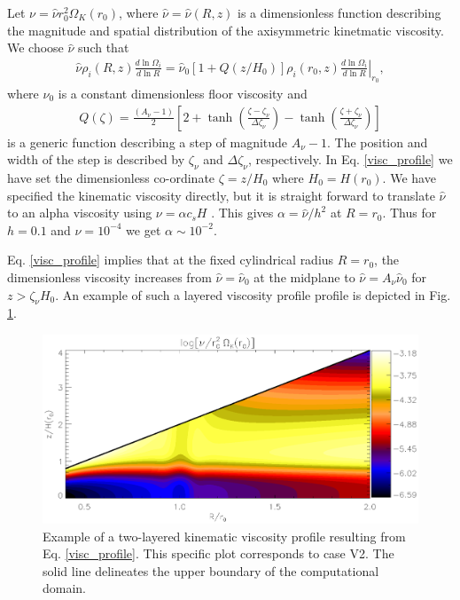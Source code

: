 Let $\nu = \hat{\nu}r_0^2\Omega_K(r_0)$, where
$\hat{\nu}=\hat{\nu}(R,z)$ is a dimensionless function describing
the magnitude and spatial distribution of the axisymmetric kinetmatic
viscosity. We choose $\hat{\nu}$ such that   
\begin{align}\label{visc_profile}
  \hat{\nu}\rho_i(R,z)\frac{d\ln{\Omega_i}}{d\ln{R}} =
  \hat{\nu}_0\left[1+Q(z/H_0)\right]\rho_i(r_0,z)\left.\frac{d\ln{\Omega_i}}{d\ln{R}}\right|_{r_0}, 
\end{align}
where $\nu_0$ is a constant dimensionless floor viscosity and   
\begin{align}\label{step}
  Q(\zeta) = \frac{\left(A_\nu - 1\right)}{2}
  \left[  2 + \tanh{\left(\frac{\zeta - \zeta_\nu}{\Delta\zeta_\nu}\right)}
    - \tanh{\left(\frac{\zeta +
        \zeta_\nu}{\Delta\zeta_\nu}\right)}\right]
\end{align}
is a generic function describing a step of magnitude
$A_\nu-1$. The position and width of the step is described by
$\zeta_\nu$ and $\Delta\zeta_\nu$, respectively. 
In Eq. \ref{visc_profile} we have set the dimensionless co-ordinate
$\zeta=z/H_0$ where $H_0=H(r_0)$. We have specified
the kinematic viscosity directly, but it is straight forward to
translate $\hat{\nu}$ to an alpha viscosity 
using $\nu = \alpha c_s H$ \citep{shakura73}. This gives $\alpha =
\hat{\nu}/h^2$ at $R=r_0$.  Thus for $h=0.1$ and $\hat{\nu}=10^{-4}$ we
get $\alpha\sim 10^{-2}$.  

Eq. \ref{visc_profile} implies that at the fixed cylindrical radius
$R=r_0$, the dimensionless viscosity increases from $\hat{\nu} =
\hat{\nu}_0$ at the midplane to $\hat{\nu} = A_\nu\hat{\nu}_0$ for
$z > \zeta_\nu H_0$. An example of such a layered viscosity profile
profile is depicted in Fig. \ref{visc2d}. 
 

\begin{figure}
  \centering
  \includegraphics[width=\linewidth]{figures/pdisk_visc2d_layer2}
  \caption{Example of a two-layered kinematic viscosity profile
    resulting from Eq. \ref{visc_profile}. This specific plot
    corresponds to case V2. The solid line
    delineates the upper boundary of the computational domain.
    \label{visc2d}}
\end{figure}



